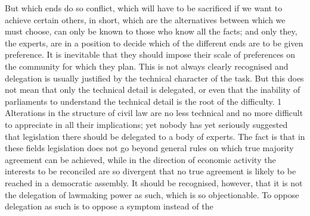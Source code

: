 \documentclass[11pt,openany]{book}
\begin{document}
But which ends do so conflict, which will have to be sacrificed if we want to achieve certain others, in short, which are the alternatives between which we must choose, can only be known to those who know all the facts; and only they, the experts, are in a position to decide which of the different ends are to be given preference. It is inevitable that they should impose their scale of preferences on the community for which they plan. This is not always clearly recognised and delegation is usually justified by the technical character of the task. But this does not mean that only the technical detail is delegated, or even that the inability of parliaments to understand the technical detail is the root of the difficulty. 1 Alterations in the structure of civil law are no less technical and no more difficult to appreciate in all their implications; yet nobody has yet seriously suggested that legislation there should be delegated to a body of experts. The fact is that in these fields legislation does not go beyond general rules on which true majority agreement can be achieved, while in the direction of economic activity the interests to be reconciled are so divergent that no true agreement is likely to be reached in a democratic assembly. It should be recognised, however, that it is not the delegation of lawmaking power as such, which is so objectionable. To oppose delegation as such is to oppose a symptom instead of the
\end{document}

